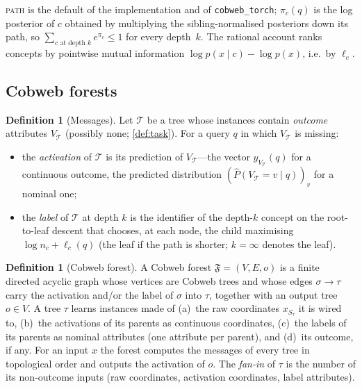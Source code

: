 \documentclass[11pt]{article}
\theoremstyle{definition}
\newtheorem{definition}[theorem]{Definition}
\theoremstyle{remark}
\newcommand{\T}{\mathcal{T}}
\newcommand{\F}{\mathfrak{F}}
\newcommand{\hy}{\hat{y}}
\begin{document}
\textsc{path} is the default of the implementation and of \texttt{cobweb\_torch};
$\pi_c(q)$ is the log posterior of $c$ obtained by multiplying the sibling-normalised
posteriors down its path, so $\sum_{c\text{ at depth }k}e^{\pi_c}\le1$ for every
depth~$k$.  The rational account \citep{maclellan2026rational} ranks concepts by
pointwise mutual information $\log p(x\mid c)-\log p(x)$, i.e.\ by $\ell_c$.

\subsection{Cobweb forests}

\begin{definition}[Messages]\label{def:messages}
Let $\T$ be a tree whose instances contain \emph{outcome} attributes $V_\T$ (possibly
none; \cref{def:task}).  For a query $q$ in which $V_\T$ is missing:
\begin{itemize}[leftmargin=*]
\item the \emph{activation} of $\T$ is its prediction of $V_\T$---the vector
  $\hy_{V_\T}(q)$ for a continuous outcome, the predicted distribution
  $(\hat P(V_\T{=}v\mid q))_v$ for a nominal one;
\item the \emph{label} of $\T$ at depth $k$ is the identifier of the depth-$k$ concept
  on the root-to-leaf descent that chooses, at each node, the child maximising
  $\log n_c+\ell_c(q)$ (the leaf if the path is shorter; $k=\infty$ denotes the leaf).
\end{itemize}
\end{definition}

\begin{definition}[Cobweb forest]\label{def:forest}
A Cobweb forest $\F=(V,E,o)$ is a finite directed acyclic graph whose vertices are
Cobweb trees and whose edges $\sigma\to\tau$ carry the activation and/or the label of
$\sigma$ into $\tau$, together with an output tree $o\in V$.  A tree $\tau$ learns
instances made of (a)~the raw coordinates $x_{S_\tau}$ it is wired to, (b)~the activations
of its parents as continuous coordinates, (c)~the labels of its parents as nominal
attributes (one attribute per parent), and (d)~its outcome, if any.  For an input $x$
the forest computes the messages of every tree in topological order and outputs the
activation of $o$.  The \emph{fan-in} of $\tau$ is the number of its non-outcome inputs
(raw coordinates, activation coordinates, label attributes).
\end{definition}
\end{document}
